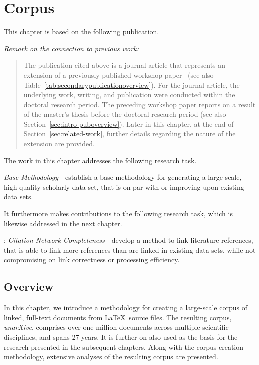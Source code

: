 \chapter{Corpus}
\label{chp:corpus}

This chapter is based on the following publication.

\begin{infobox-pub}
\end{infobox-pub}
\vspace{-0.5em}
\begin{footnotesize}
\textit{Remark on the connection to previous work:}
\vspace{-0.5em}
\begin{quote}
The publication cited above is a journal article that represents an extension of a previously published workshop paper~\cite{Saier2019} (see also Table~\ref{tab:secondarypublicationoverview}). For the journal article, the underlying work, writing, and publication were conducted within the doctoral research period. The preceding workshop paper reports on a result of the master's thesis before the doctoral research period (see also Section~\ref{sec:intro-puboverview}). Later in this chapter, at the end of Section~\ref{sec:related-work}, further details regarding the nature of the extension are provided.
\end{quote}
\end{footnotesize}

The work in this chapter addresses the following research task.

\begin{rtlist}
    \item \textit{Base Methodology} - establish a base methodology for generating a large-scale, high-quality scholarly data set, that is on par with or improving upon existing data sets.
\end{rtlist}

It furthermore makes contributions to the following research task, which is likewise addressed in the next chapter.

\begin{rtlist}
    \item[\rtmark{2}:] \textit{Citation Network Completeness} - develop a method to link literature references, that is able to link more references than are linked in existing data sets, while not compromising on link correctness or processing efficiency.
\end{rtlist}

\section{Overview}
In this chapter, we introduce a methodology for creating a large-scale corpus of linked, full-text documents from \LaTeX\ source files. The resulting corpus, \emph{unarXive}, comprises over one million documents across multiple scientific disciplines, and spans 27 years. It is further on also used as the basis for the research presented in the subsequent chapters. Along with the corpus creation methodology, extensive analyses of the resulting corpus are presented.

